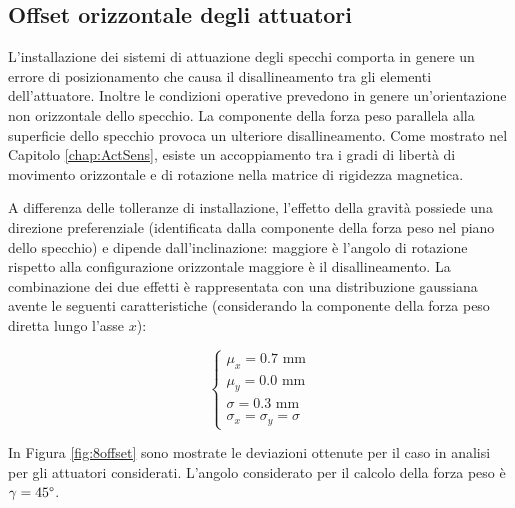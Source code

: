 \subsection{Offset orizzontale degli attuatori}
L'installazione dei sistemi di attuazione degli specchi comporta in genere un errore di posizionamento che causa il disallineamento tra gli elementi dell'attuatore. Inoltre le condizioni operative prevedono in genere un'orientazione non orizzontale dello specchio. La componente della forza peso parallela alla superficie dello specchio provoca un ulteriore disallineamento. Come mostrato nel Capitolo \ref{chap:ActSens}, esiste un accoppiamento tra i gradi di libertà di movimento orizzontale e di rotazione nella matrice di rigidezza magnetica.

A differenza delle tolleranze di installazione, l'effetto della gravità possiede una direzione preferenziale (identificata dalla componente della forza peso nel piano dello specchio) e dipende dall'inclinazione: maggiore è l'angolo di rotazione rispetto alla configurazione orizzontale maggiore è il disallineamento. La combinazione dei due effetti è rappresentata con una distribuzione gaussiana avente le seguenti caratteristiche (considerando la componente della forza peso diretta lungo l'asse $x$):

\begin{equation}
\label{eq:8offset}
\left\{
\begin{array}{l}  
\mu_x = 0.7 \text{ mm}\\
\mu_y = 0.0 \text{ mm}\\
\sigma = 0.3\text{ mm}\\
\sigma_x = \sigma_y = \sigma
\end{array}\right.
\end{equation}                                            

In Figura \ref{fig:8offset} sono mostrate le deviazioni ottenute per il caso in analisi per gli attuatori considerati. L'angolo considerato per il calcolo della forza peso è $\gamma=45\degree$.

